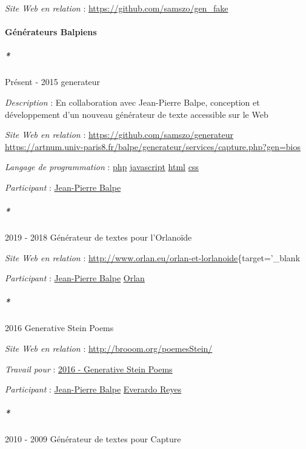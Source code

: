 \documentclass[
  a4paper,
  DIV=11,
  numbers=noendperiod]{scrreprt}
\let\oldparagraph\paragraph
\renewcommand{\paragraph}[1]{\oldparagraph{#1}\mbox{}}
\let\oldsubparagraph\subparagraph
\renewcommand{\subparagraph}[1]{\oldsubparagraph{#1}\mbox{}}
\begin{document}
\emph{Site Web en relation} : \url{https://github.com/samszo/gen_fake}

\paragraph{Générateurs Balpiens}\label{sec-item301895}

\subparagraph*{Présent - 2015 generateur}\label{sec-item299743}

\emph{Description} : En collaboration avec Jean-Pierre Balpe, conception
et développement d'un nouveau générateur de texte accessible sur le Web

\emph{Site Web en relation} : \url{https://github.com/samszo/generateur}
\url{https://artnum.univ-paris8.fr/balpe/generateur/services/capture.php?gen=bios}

\emph{Langage de programmation} :
\href{http://localhost/samszo/omk/s/fiches/item/108369}{php}
\href{http://localhost/samszo/omk/s/fiches/item/89711}{javascript}
\href{http://localhost/samszo/omk/s/fiches/item/96621}{html}
\href{http://localhost/samszo/omk/s/fiches/item/102418}{css}

\emph{Participant} :
\href{http://localhost/samszo/omk/s/fiches/item/61153}{Jean-Pierre
Balpe}

\subparagraph*{2019 - 2018 Générateur de textes pour
l'Orlanoïde}\label{sec-item299725}

\emph{Site Web en relation} :
\url{http://www.orlan.eu/orlan-et-lorlanoide}\{target='\_blank

\emph{Participant} :
\href{http://localhost/samszo/omk/s/fiches/item/61153}{Jean-Pierre
Balpe} \href{http://localhost/samszo/omk/s/fiches/item/299622}{Orlan}

\subparagraph*{2016 Generative Stein Poems}\label{sec-item299728}

\emph{Site Web en relation} : \url{http://brooom.org/poemesStein/}

\emph{Travail pour} :
\href{http://localhost/samszo/omk/s/fiches/item/69898}{2016 - Generative
Stein Poems}

\emph{Participant} :
\href{http://localhost/samszo/omk/s/fiches/item/61153}{Jean-Pierre
Balpe} \href{http://localhost/samszo/omk/s/fiches/item/62572}{Everardo
Reyes}

\subparagraph*{2010 - 2009 Générateur de textes pour
Capture}\label{guxe9nuxe9rateur-de-textes-pour-capture}
\end{document}
